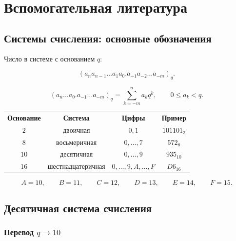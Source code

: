 \documentclass[../final.tex]{subfiles}
\begin{document}
\setcounter{chapter}{-1}
\chapter{Вспомогательная литература}



\section{Системы счисления: основные обозначения}

Число в системе с основанием $q$:

\[
(a_n a_{n-1}\ldots a_1a_0.a_{-1}a_{-2}\ldots a_{-m})_q.
\]

\[
(a_n\ldots a_0.a_{-1}\ldots a_{-m})_q
=
\sum_{k=-m}^{n} a_kq^k,
\qquad
0\leq a_k<q.
\]

\medskip

\begin{center}
\renewcommand{\arraystretch}{1.25}
\begin{tabular}{cccc}
\textcolor{rc3}{\bfseries Основание}
&
\textcolor{rc3}{\bfseries Система}
&
\textcolor{rc3}{\bfseries Цифры}
&
\textcolor{rc3}{\bfseries Пример}
\\[2mm]

$2$
&
двоичная
&
$0,1$
&
$101101_2$
\\

$8$
&
восьмеричная
&
$0,\ldots,7$
&
$572_8$
\\

$10$
&
десятичная
&
$0,\ldots,9$
&
$935_{10}$
\\

$16$
&
шестнадцатеричная
&
$0,\ldots,9,A,\ldots,F$
&
$D6_{16}$
\end{tabular}
\end{center}

\[
A=10,\qquad
B=11,\qquad
C=12,\qquad
D=13,\qquad
E=14,\qquad
F=15.
\]



\section{Десятичная система счисления}

\subsection{Перевод \texorpdfstring{$q \to 10$}{q → 10}}
\end{document}

